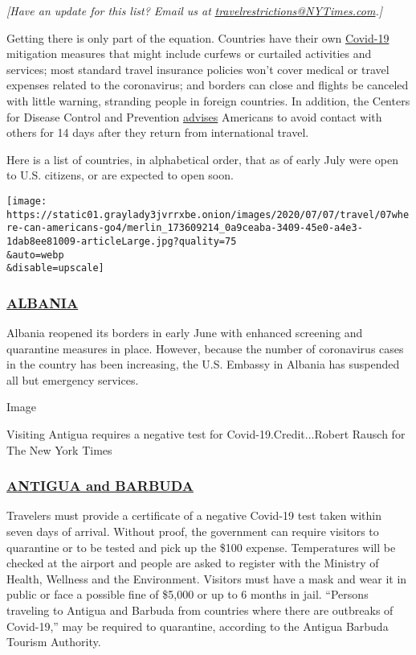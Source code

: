 \emph{{[}Have an update for this list? Email us at}
\href{mailto:travelrestrictions@NYTimes.com}{\emph{travelrestrictions@NYTimes.com}}\emph{.{]}}

Getting there is only part of the equation. Countries have their own
\href{https://www.nytimes3xbfgragh.onion/2020/07/16/travel/virus-vacation.html}{Covid-19}
mitigation measures that might include curfews or curtailed activities
and services; most standard travel insurance policies won't cover
medical or travel expenses related to the coronavirus; and borders can
close and flights be canceled with little warning, stranding people in
foreign countries. In addition, the Centers for Disease Control and
Prevention
\href{https://www.cdc.gov/coronavirus/2019-ncov/travelers/after-travel-precautions.html}{advises}
Americans to avoid contact with others for 14 days after they return
from international travel.

Here is a list of countries, in alphabetical order, that as of early
July were open to U.S. citizens, or are expected to open soon.

\texttt{[image: https://static01.graylady3jvrrxbe.onion/images/2020/07/07/travel/07where-can-americans-go4/merlin\_173609214\_0a9ceaba-3409-45e0-a4e3-1dab8ee81009-articleLarge.jpg?quality=75\\\&auto=webp\\\&disable=upscale]}

\hypertarget{albania}{%
\subsubsection{\texorpdfstring{\href{https://al.usembassy.gov/updates_covid19/}{ALBANIA}}{ALBANIA}}\label{albania}}

Albania reopened its borders in early June with enhanced screening and
quarantine measures in place. However, because the number of coronavirus
cases in the country has been increasing, the U.S. Embassy in Albania
has suspended all but emergency services.

Image

Visiting Antigua requires a negative test for Covid-19.Credit...Robert
Rausch for The New York Times

\hypertarget{antigua-and-barbuda}{%
\subsubsection{\texorpdfstring{\href{https://visitantiguabarbuda.com/travel-advisory/}{ANTIGUA
and BARBUDA}}{ANTIGUA and BARBUDA}}\label{antigua-and-barbuda}}

Travelers must provide a certificate of a negative Covid-19 test taken
within seven days of arrival. Without proof, the government can require
visitors to quarantine or to be tested and pick up the \$100 expense.
Temperatures will be checked at the airport and people are asked to
register with the Ministry of Health, Wellness and the Environment.
Visitors must have a mask and wear it in public or face a possible fine
of \$5,000 or up to 6 months in jail. ``Persons traveling to Antigua and
Barbuda from countries where there are outbreaks of Covid-19,'' may be
required to quarantine, according to the Antigua Barbuda Tourism
Authority.

